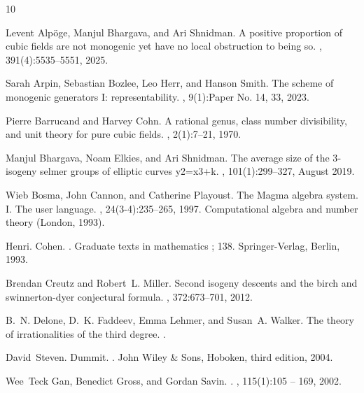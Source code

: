 \documentclass[oneside]{amsart}
\theoremstyle{definition}
\begin{document}
\newpage

\begin{thebibliography}{10}

Levent Alp\"oge, Manjul Bhargava, and Ari Shnidman.
\newblock A positive proportion of cubic fields are not monogenic yet have no
  local obstruction to being so.
, 391(4):5535--5551, 2025.

Sarah Arpin, Sebastian Bozlee, Leo Herr, and Hanson Smith.
\newblock The scheme of monogenic generators {I}: representability.
, 9(1):Paper No. 14, 33, 2023.

Pierre Barrucand and Harvey Cohn.
\newblock A rational genus, class number divisibility, and unit theory for pure
  cubic fields.
, 2(1):7--21, 1970.

Manjul Bhargava, Noam Elkies, and Ari Shnidman.
\newblock The average size of the 3‐isogeny selmer groups of elliptic curves
  y2=x3+k.
, 101(1):299–327,
  August 2019.

Wieb Bosma, John Cannon, and Catherine Playoust.
\newblock The {M}agma algebra system. {I}. {T}he user language.
, 24(3-4):235--265, 1997.
\newblock Computational algebra and number theory (London, 1993).

Henri. Cohen.
.
\newblock Graduate texts in mathematics ; 138. Springer-Verlag, Berlin, 1993.

Brendan Creutz and Robert~L. Miller.
\newblock Second isogeny descents and the birch and swinnerton-dyer conjectural
  formula.
, 372:673--701, 2012.

B.~N. Delone, D.~K. Faddeev, Emma Lehmer, and Susan~A. Walker.
\newblock The theory of irrationalities of the third degree.
.

David~Steven. Dummit.
.
\newblock John Wiley \& Sons, Hoboken, third edition, 2004.

Wee~Teck Gan, Benedict Gross, and Gordan Savin.
.
, 115(1):105 -- 169, 2002.


\end{thebibliography}
\end{document}

